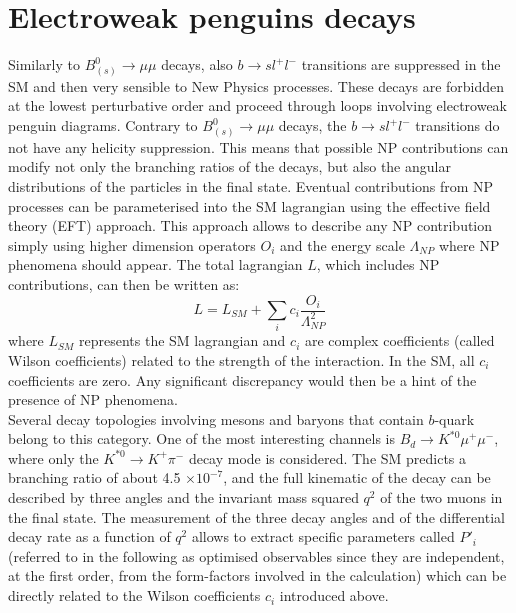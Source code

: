 \section{Electroweak penguins decays}
Similarly to $B^0_{(s)} \to \mu \mu$ decays, also $b \to s l^+ l^-$ transitions are suppressed in the SM and then very sensible to New Physics processes. These decays are forbidden at the lowest perturbative order and proceed through loops involving electroweak penguin diagrams. Contrary to $B^0_{(s)} \to \mu \mu$ decays, the $b \to s l^+ l^-$ transitions do not have any helicity suppression. This means that possible NP contributions can modify not only the branching ratios of the decays, but also the angular distributions of the particles in the final state. Eventual contributions from NP processes can be parameterised into the SM lagrangian using the effective field theory (EFT) approach. This approach allows to describe any NP contribution simply using higher dimension operators $O_i$ and the energy scale $\Lambda_{NP}$ where NP phenomena should appear. The total lagrangian $L$, which includes NP contributions, can then be written as:
\begin{equation}
L = L_{SM}+\sum_i c_i \frac{O_i}{\Lambda^2_{NP}}
\label{eq:wilson}
\end{equation}
where $L_{SM}$ represents the SM lagrangian and $c_i$ are complex coefficients (called Wilson coefficients) related to the strength of the interaction. In the SM, all $c_i$ coefficients are zero. Any significant discrepancy would then be a hint of the presence of NP phenomena.\\
Several decay topologies involving mesons and baryons that contain $b$-quark belong to this category. One of the most interesting channels is $B_d \to K^{*0} \mu^+ \mu^-$, where only the $K^{*0} \to K^+ \pi^-$ decay mode is considered. The SM predicts a branching ratio of about 4.5 $\times 10^{-7}$, and the full kinematic of the decay can be described by three angles and the invariant mass squared $q^2$ of the two muons in the final state. The measurement of the three decay angles and of the differential decay rate as a function of $q^2$ allows to extract specific parameters called $P'_i$ (referred to in the following as optimised observables since they are independent, at the first order, from the form-factors involved in the calculation) which can be directly related to the Wilson coefficients $c_i$ introduced above. \\
